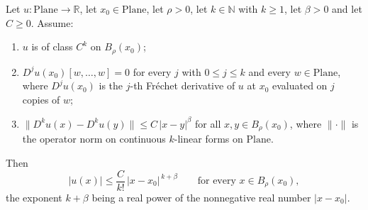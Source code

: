 \begin{lemma}
Let $u\colon\mathrm{Plane}\to\mathbb{R}$, let $x_0\in\mathrm{Plane}$, let $\rho>0$, let
$k\in\mathbb{N}$ with $k\ge1$, let $\beta>0$ and let $C\ge0$.  Assume:
\begin{enumerate}
\item $u$ is of class $C^{k}$ on $B_\rho(x_0)$;
\item $D^{j}u(x_0)[w,\ldots,w]=0$ for every $j$ with $0\le j\le k$ and every
$w\in\mathrm{Plane}$, where $D^{j}u(x_0)$ is the $j$-th Fr\'echet derivative of $u$ at $x_0$
evaluated on $j$ copies of $w$;
\item $\bigl\lVert D^{k}u(x)-D^{k}u(y)\bigr\rVert\le C\,\lvert x-y\rvert^{\beta}$ for all
$x,y\in B_\rho(x_0)$, where $\lVert\cdot\rVert$ is the operator norm on continuous $k$-linear
forms on $\mathrm{Plane}$.
\end{enumerate}
Then
\[
  \lvert u(x)\rvert\le\frac{C}{k!}\,\lvert x-x_0\rvert^{\,k+\beta}
  \qquad\text{for every }x\in B_\rho(x_0),
\]
the exponent $k+\beta$ being a real power of the nonnegative real number $\lvert x-x_0\rvert$.
\end{lemma}
